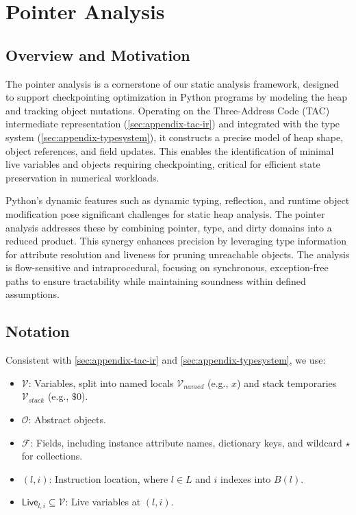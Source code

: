 \newpage

\section{Pointer Analysis}
\label{sec:appendix-pointer}

\subsection{Overview and Motivation}

The pointer analysis is a cornerstone of our static analysis framework, designed to support checkpointing optimization in Python programs by modeling the heap and tracking object mutations. Operating on the Three-Address Code (TAC) intermediate representation (\autoref{sec:appendix-tac-ir}) and integrated with the type system (\autoref{sec:appendix-typesystem}), it constructs a precise model of heap shape, object references, and field updates. This enables the identification of minimal live variables and objects requiring checkpointing, critical for efficient state preservation in numerical workloads.

Python’s dynamic features such as dynamic typing, reflection, and runtime object modification pose significant challenges for static heap analysis. The pointer analysis addresses these by combining pointer, type, and dirty domains into a reduced product. This synergy enhances precision by leveraging type information for attribute resolution and liveness for pruning unreachable objects. The analysis is flow-sensitive and intraprocedural, focusing on synchronous, exception-free paths to ensure tractability while maintaining soundness within defined assumptions.

\subsection{Notation}

Consistent with \autoref{sec:appendix-tac-ir} and \autoref{sec:appendix-typesystem}, we use:
\begin{itemize}
    \item $\mathcal{V}$: Variables, split into named locals $\mathcal{V}_{\mathit{named}}$ (e.g., $x$) and stack temporaries $\mathcal{V}_{\mathit{stack}}$ (e.g., $\$0$).
    \item $\mathcal{O}$: Abstract objects.
    \item $\mathcal{F}$: Fields, including instance attribute names, dictionary keys, and wildcard $\star$ for collections.
    \item $(l, i)$: Instruction location, where $l \in L$ and $i$ indexes into $B(l)$.
    \item $\mathsf{Live}_{l,i} \subseteq \mathcal{V}$: Live variables at $(l,i)$.
\end{itemize}

